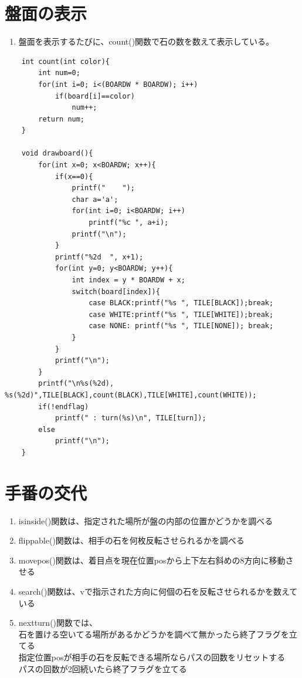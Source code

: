 \documentclass[uplatex,a4paper,11pt,oneside,openany]{jsarticle}
\begin{document}
\section{盤面の表示}

\begin{enumerate}
\item 盤面を表示するたびに、count()関数で石の数を数えて表示している。
\end{enumerate}

\begin{lstlisting}
	int count(int color){
		int num=0;
		for(int i=0; i<(BOARDW * BOARDW); i++)
			if(board[i]==color)
				num++;
		return num;
	}
	
	void drawboard(){
		for(int x=0; x<BOARDW; x++){
			if(x==0){
				printf("    ");
				char a='a';
				for(int i=0; i<BOARDW; i++)
					printf("%c ", a+i);
				printf("\n");
			}
			printf("%2d  ", x+1);
			for(int y=0; y<BOARDW; y++){
				int index = y * BOARDW + x;
				switch(board[index]){
					case BLACK:printf("%s ", TILE[BLACK]);break;
					case WHITE:printf("%s ", TILE[WHITE]);break;
					case NONE: printf("%s ", TILE[NONE]); break;
				}
			}
			printf("\n");
		}
		printf("\n%s(%2d), %s(%2d)",TILE[BLACK],count(BLACK),TILE[WHITE],count(WHITE));
		if(!endflag)
			printf(" : turn(%s)\n", TILE[turn]);
		else
			printf("\n");
	}
\end{lstlisting}

\section{手番の交代}

\begin{enumerate}
\item isinside()関数は、指定された場所が盤の内部の位置かどうかを調べる
\item flippable()関数は、相手の石を何枚反転させられるかを調べる
\item movepos()関数は、着目点を現在位置posから上下左右斜めの8方向に移動させる
\item search()関数は、vで指示された方向に何個の石を反転させられるかを数えている
\item nextturn()関数では、\\石を置ける空いてる場所があるかどうかを調べて無かったら終了フラグを立てる\\
指定位置posが相手の石を反転できる場所ならパスの回数をリセットする\\
パスの回数が2回続いたら終了フラグを立てる
\end{enumerate}
\end{document}
